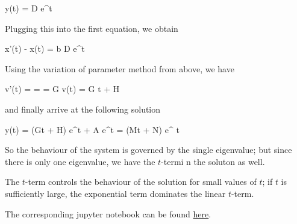 \bee
y(t) = D e^{\lambda t}
\eee

Plugging this into the first equation, we obtain

\bee
x'(t) - \lambda x(t) = b D e^{\lambda t}
\eee

Using the variation of parameter method from above, we have

\bee
v'(t) =  =  = G \rightarrow v(t) = G t + H
\eee

and finally arrive at the following solution

\bee
y(t) = (Gt + H) e^{\lambda t} + A e^{\lambda t} = (Mt + N) e^{ \lambda t}
\eee

So the behaviour of the system is governed by the single eigenvalue; but since there is only one eigenvalue, we have the $t$-termi n the soluton as well.

The $t$-term controls the behaviour of the solution for small values of $t$; if $t$ is sufficiently large, the exponential term dominates the linear $t$-term.

The corresponding jupyter notebook can be found \href{https://github.com/ClemensFMN/Notebooks/blob/main/ODE/Ex_5.2.11.ipynb}{here}.


